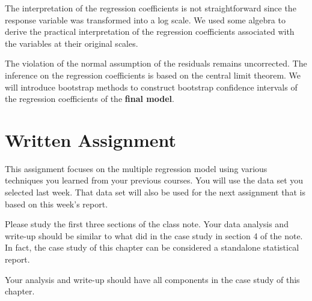 \documentclass[
]{book}
\begin{document}
The interpretation of the regression coefficients is not straightforward since the response variable was transformed into a log scale. We used some algebra to derive the practical interpretation of the regression coefficients associated with the variables at their original scales.

The violation of the normal assumption of the residuals remains uncorrected. The inference on the regression coefficients is based on the central limit theorem. We will introduce bootstrap methods to construct bootstrap confidence intervals of the regression coefficients of the \textbf{final model}.

\hypertarget{written-assignment}{%
\section{Written Assignment}\label{written-assignment}}

This assignment focuses on the multiple regression model using various techniques you learned from your previous courses. You will use the data set you selected last week. That data set will also be used for the next assignment that is based on this week's report.

Please study the first three sections of the class note. Your data analysis and write-up should be similar to what did in the case study in section 4 of the note. In fact, the case study of this chapter can be considered a standalone statistical report.

Your analysis and write-up should have all components in the case study of this chapter.
\end{document}
